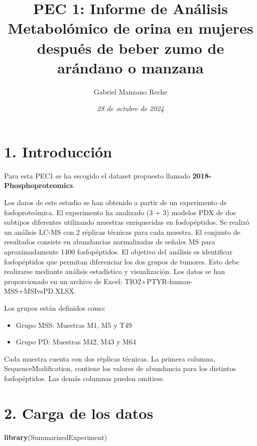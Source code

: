\documentclass[
]{article}
\title{PEC 1: Informe de Análisis Metabolómico de orina en mujeres
después de beber zumo de arándano o manzana}
\author{Gabriel Manzano Reche}
\date{\emph{28 de octubre de 2024}}
\newenvironment{Shaded}{\begin{snugshade}}{\end{snugshade}}
\newcommand{\FunctionTok}[1]{\textcolor[rgb]{0.13,0.29,0.53}{\textbf{#1}}}
\newcommand{\NormalTok}[1]{#1}
\providecommand{\tightlist}{%
  \setlength{\itemsep}{0pt}\setlength{\parskip}{0pt}}
\begin{document}
\maketitle

{
\setcounter{tocdepth}{2}
\tableofcontents
}
\pagebreak

\section{1. Introducción}\label{introducciuxf3n}

Para esta PEC1 se ha escogido el dataset propuesto llamado
\textbf{2018-Phosphoproteomics}.

Los daros de este estudio se han obtenido a partir de un experimento de
fosfoproteómica. El experimento ha analizado (3 + 3) modelos PDX de dos
subtipos diferentes utilizando muestras enriquecidas en fosfopéptidos.
Se realizó un análisis LC-MS con 2 réplicas técnicas para cada muestra.
El conjunto de resultados consiste en abundancias normalizadas de
señales MS para aproximadamente 1400 fosfopéptidos. El objetivo del
análisis es identificar fosfopéptidos que permitan diferenciar los dos
grupos de tumores. Esto debe realizarse mediante análisis estadístico y
visualización. Los datos se han proporcionado en un archivo de Excel:
TIO2+PTYR-human-MSS+MSIvsPD.XLSX.

Los grupos están definidos como:

\begin{itemize}
\tightlist
\item
  Grupo MSS: Muestras M1, M5 y T49
\item
  Grupo PD: Muestras M42, M43 y M64
\end{itemize}

Cada muestra cuenta con dos réplicas técnicas. La primera columna,
SequenceModification, contiene los valores de abundancia para los
distintos fosfopéptidos. Las demás columnas pueden omitirse.

\section{2. Carga de los datos}\label{carga-de-los-datos}

\begin{Shaded}
\begin{Highlighting}[]
\FunctionTok{library}\NormalTok{(SummarizedExperiment)}
\end{Highlighting}
\end{Shaded}
\end{document}
